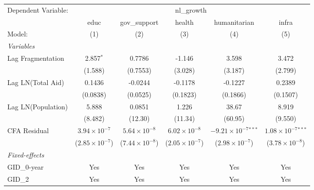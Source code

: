 \begingroup
\centering
\begin{tabular}{lccccc}
   \tabularnewline \midrule \midrule
   Dependent Variable: & \multicolumn{5}{c}{nl\_growth}\\
                      & educ                    & gov\_support            & health                  & humanitarian                   & infra \\   
   Model:             & (1)                     & (2)                     & (3)                     & (4)                            & (5)\\  
   \midrule
   \emph{Variables}\\
   Lag Fragmentation  & 2.857$^{*}$             & 0.7786                  & -1.146                  & 3.598                          & 3.472\\   
                      & (1.588)                 & (0.7553)                & (3.028)                 & (3.187)                        & (2.799)\\   
   Lag LN(Total Aid)  & 0.1436                  & -0.0244                 & -0.1178                 & -0.1227                        & 0.2389\\   
                      & (0.0838)                & (0.0525)                & (0.1823)                & (0.1866)                       & (0.1507)\\   
   Lag LN(Population) & 5.888                   & 0.0851                  & 1.226                   & 38.67                          & 8.919\\   
                      & (8.482)                 & (12.30)                 & (11.34)                 & (60.95)                        & (9.550)\\   
   CFA Residual       & $3.94\times 10^{-7}$    & $5.64\times 10^{-8}$    & $6.02\times 10^{-8}$    & $-9.21\times 10^{-7}$$^{***}$  & $1.08\times 10^{-7}$$^{***}$\\    
                      & ($2.85\times 10^{-7}$)  & ($7.44\times 10^{-8}$)  & ($2.05\times 10^{-7}$)  & ($2.98\times 10^{-7}$)         & ($3.78\times 10^{-8}$)\\    
   \midrule
   \emph{Fixed-effects}\\
   GID\_0-year        & Yes                     & Yes                     & Yes                     & Yes                            & Yes\\  
   GID\_2             & Yes                     & Yes                     & Yes                     & Yes                            & Yes\\  

\end{tabular}
